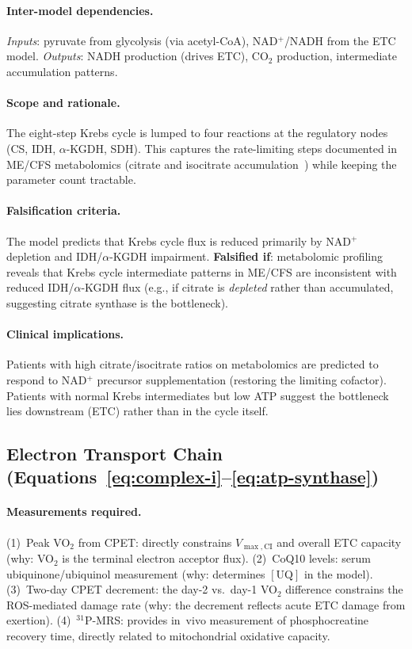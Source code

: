 \paragraph{Inter-model dependencies.}
\emph{Inputs}: pyruvate from glycolysis (via acetyl-CoA), NAD$^+$/NADH from the ETC model. \emph{Outputs}: NADH production (drives ETC), CO$_2$ production, intermediate accumulation patterns.

\paragraph{Scope and rationale.}
The eight-step Krebs cycle is lumped to four reactions at the regulatory nodes (CS, IDH, $\alpha$-KGDH, SDH). This captures the rate-limiting steps documented in ME/CFS metabolomics (citrate and isocitrate accumulation~\cite{Germain2020metabolic}) while keeping the parameter count tractable.

\paragraph{Falsification criteria.}
The model predicts that Krebs cycle flux is reduced primarily by NAD$^+$ depletion and IDH/$\alpha$-KGDH impairment. \textbf{Falsified if}: metabolomic profiling reveals that Krebs cycle intermediate patterns in ME/CFS are inconsistent with reduced IDH/$\alpha$-KGDH flux (e.g., if citrate is \emph{depleted} rather than accumulated, suggesting citrate synthase is the bottleneck).

\paragraph{Clinical implications.}
Patients with high citrate/isocitrate ratios on metabolomics are predicted to respond to NAD$^+$ precursor supplementation (restoring the limiting cofactor). Patients with normal Krebs intermediates but low ATP suggest the bottleneck lies downstream (ETC) rather than in the cycle itself.

\subsection{Electron Transport Chain (Equations~\ref{eq:complex-i}--\ref{eq:atp-synthase})}

\paragraph{Measurements required.}
(1)~Peak VO$_2$ from CPET: directly constrains $V_{\max,\text{CI}}$ and overall ETC capacity (why: VO$_2$ is the terminal electron acceptor flux).
(2)~CoQ10 levels: serum ubiquinone/ubiquinol measurement (why: determines $[\text{UQ}]$ in the model).
(3)~Two-day CPET decrement: the day-2 vs.\ day-1 VO$_2$ difference constrains the ROS-mediated damage rate (why: the decrement reflects acute ETC damage from exertion).
(4)~$^{31}$P-MRS: provides in~vivo measurement of phosphocreatine recovery time, directly related to mitochondrial oxidative capacity.

